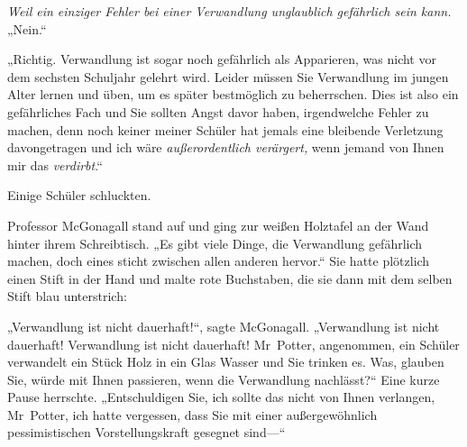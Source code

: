 \emph{Weil ein einziger Fehler bei einer Verwandlung unglaublich gefährlich sein kann.} „Nein.“

„Richtig. Verwandlung ist sogar noch gefährlich als Apparieren, was nicht vor dem sechsten Schuljahr gelehrt wird. Leider müssen Sie Verwandlung im jungen Alter lernen und üben, um es später bestmöglich zu beherrschen. Dies ist also ein gefährliches Fach und Sie sollten Angst davor haben, irgendwelche Fehler zu machen, denn noch keiner meiner Schüler hat jemals eine bleibende Verletzung davongetragen und ich wäre \emph{außerordentlich verärgert,} wenn jemand von Ihnen mir das \emph{verdirbt}.“

Einige Schüler schluckten.

Professor McGonagall stand auf und ging zur weißen Holztafel an der Wand hinter ihrem Schreibtisch. „Es gibt viele Dinge, die Verwandlung gefährlich machen, doch eines sticht zwischen allen anderen hervor.“ Sie hatte plötzlich einen Stift in der Hand und malte rote Buchstaben, die sie dann mit dem selben Stift blau unterstrich:


„Verwandlung ist nicht dauerhaft!“, sagte McGonagall. „Verwandlung ist nicht dauerhaft! Verwandlung ist nicht dauerhaft! Mr~Potter, angenommen, ein Schüler verwandelt ein Stück Holz in ein Glas Wasser und Sie trinken es. Was, glauben Sie, würde mit Ihnen passieren, wenn die Verwandlung nachlässt?“ Eine kurze Pause herrschte. „Entschuldigen Sie, ich sollte das nicht von Ihnen verlangen, Mr~Potter, ich hatte vergessen, dass Sie mit einer außergewöhnlich pessimistischen Vorstellungskraft gesegnet sind—“


